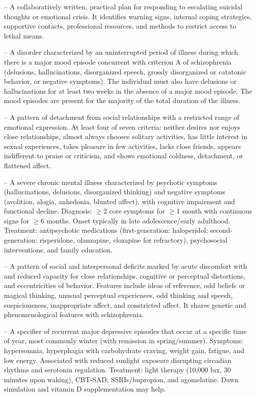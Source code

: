 -- A collaboratively written, practical plan for responding to escalating suicidal thoughts or emotional crisis. It identifies warning signs, internal coping strategies, supportive contacts, professional resources, and methods to restrict access to lethal means.

-- A disorder characterized by an uninterrupted period of illness during which there is a major mood episode concurrent with criterion A of schizophrenia (delusions, hallucinations, disorganized speech, grossly disorganized or catatonic behavior, or negative symptoms). The individual must also have delusions or hallucinations for at least two weeks in the absence of a major mood episode. The mood episodes are present for the majority of the total duration of the illness.

-- A pattern of detachment from social relationships with a restricted range of emotional expression. At least four of seven criteria: neither desires nor enjoys close relationships, almost always chooses solitary activities, has little interest in sexual experiences, takes pleasure in few activities, lacks close friends, appears indifferent to praise or criticism, and shows emotional coldness, detachment, or flattened affect.

-- A severe chronic mental illness characterized by psychotic symptoms (hallucinations, delusions, disorganized thinking) and negative symptoms (avolition, alogia, anhedonia, blunted affect), with cognitive impairment and functional decline. Diagnosis: \(\ge\)2 core symptoms for \(\ge\)1 month with continuous signs for \(\ge\)6 months. Onset typically in late adolescence/early adulthood. Treatment: antipsychotic medications (first-generation: haloperidol; second-generation: risperidone, olanzapine, clozapine for refractory), psychosocial interventions, and family education.

-- A pattern of social and interpersonal deficits marked by acute discomfort with and reduced capacity for close relationships, cognitive or perceptual distortions, and eccentricities of behavior. Features include ideas of reference, odd beliefs or magical thinking, unusual perceptual experiences, odd thinking and speech, suspiciousness, inappropriate affect, and constricted affect. It shares genetic and phenomenological features with schizophrenia.

-- A specifier of recurrent major depressive episodes that occur at a specific time of year, most commonly winter (with remission in spring/summer). Symptoms: hypersomnia, hyperphagia with carbohydrate craving, weight gain, fatigue, and low energy. Associated with reduced sunlight exposure disrupting circadian rhythms and serotonin regulation. Treatment: light therapy (10,000 lux, 30 minutes upon waking), CBT-SAD, SSRIs/bupropion, and agomelatine. Dawn simulation and vitamin D supplementation may help.

